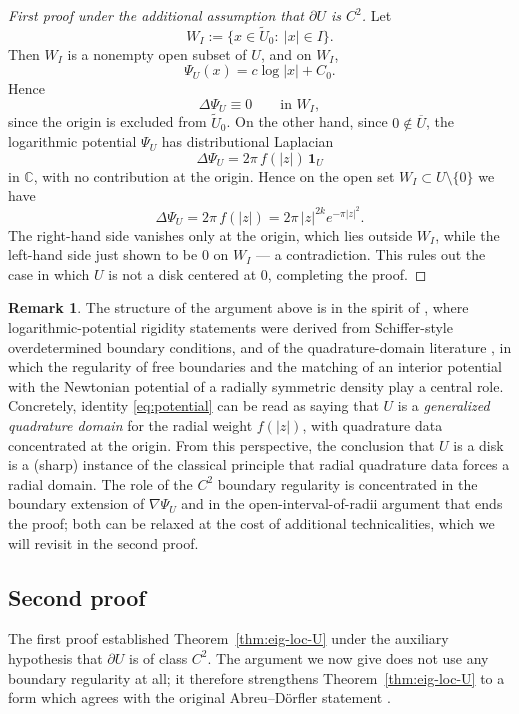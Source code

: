 \documentclass[a4paper,11pt,reqno]{amsart}
\numberwithin{equation}{section}
\theoremstyle{plain} %
\theoremstyle{definition} %
\newtheorem{remark}{Remark}[section]
\theoremstyle{remark}
\newcommand{\C}{\mathbb{C}}
\begin{document}
\begin{proof}[First proof under the additional assumption that $\partial U$ is $C^2$]
Let
\[
W_I:=\{x\in \widetilde U_0:\ |x|\in I\}.
\]
Then \(W_I\) is a nonempty open subset of \(U\), and on \(W_I\),
\[
\Psi_U(x)=c\log|x|+C_0.
\]
Hence
\[
\Delta \Psi_U\equiv 0 \qquad \text{in } W_I,
\]
since the origin is excluded from $\widetilde U_0$. On the other hand,
since $0\notin \overline{U}$, the logarithmic potential $\Psi_U$ has
distributional Laplacian
\[
\Delta \Psi_U=2\pi\, f(|z|)\,\mathbf{1}_U
\]
in $\C$, with no contribution at the origin. Hence on the open set
$W_I\subset U\setminus\{0\}$ we have
\[
\Delta \Psi_U=2\pi\, f(|z|)=2\pi\, |z|^{2k}e^{-\pi |z|^2}.
\]
The right-hand side vanishes only at the origin, which lies outside
$W_I$, while the left-hand side just shown to be $0$ on $W_I$ — a
contradiction. This rules out the case in which $U$ is not a disk
centered at $0$, completing the proof.
\end{proof}

\begin{remark}
The structure of the argument above is in the spirit of
\cite{Aharonov-Schiffer-Zalcman}, where logarithmic-potential
rigidity statements were derived from Schiffer-style overdetermined
boundary conditions, and of the quadrature-domain literature
\cite{Gustafsson,Gustafsson-Shahgholian,Shahgholian,Karp}, in which
the regularity of free boundaries and the matching of an interior
potential with the Newtonian potential of a radially symmetric
density play a central role. Concretely, identity
\eqref{eq:potential} can be read as saying that $U$ is a
\emph{generalized quadrature domain} for the radial weight $f(|z|)$,
with quadrature data concentrated at the origin. From this perspective,
the conclusion that $U$ is a disk is a (sharp) instance of the
classical principle that radial quadrature data forces a radial
domain. The role of the $C^2$ boundary regularity is concentrated
in the boundary extension of $\nabla\Psi_U$ and in the
open-interval-of-radii argument that ends the proof; both can be
relaxed at the cost of additional technicalities, which we will
revisit in the second proof.
\end{remark}

\subsection{Second proof}\label{subsec:second-proof}

The first proof established Theorem~\ref{thm:eig-loc-U} under the auxiliary
hypothesis that $\partial U$ is of class $C^2$. The argument we now give does
not use any boundary regularity at all; it therefore strengthens
Theorem~\ref{thm:eig-loc-U} to a form which agrees with the original
Abreu--D\"orfler statement \cite{Abreu-Doerfler}.
\end{document}
